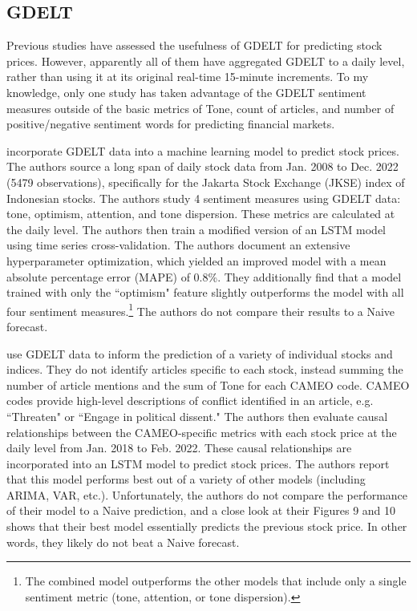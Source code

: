\documentclass[12pt]{article}
\begin{document}
\subsection{GDELT}
Previous studies have assessed the usefulness of GDELT for predicting stock prices. However, apparently all of them have aggregated GDELT to a daily level, rather than using it at its original real-time 15-minute increments. To my knowledge, only one study has taken advantage of the GDELT sentiment measures outside of the basic metrics of Tone, count of articles, and number of positive/negative sentiment words for predicting financial markets.

\textcite{nashir2023indonesian} incorporate GDELT data into a machine learning model to predict stock prices. The authors source a long span of daily stock data from Jan. 2008 to Dec. 2022 (5479 observations), specifically for the Jakarta Stock Exchange (JKSE) index of Indonesian stocks. The authors study 4 sentiment measures using GDELT data: tone, optimism, attention, and tone dispersion. These metrics are calculated at the daily level. The authors then train a modified version of an LSTM model using time series cross-validation. The authors document an extensive hyperparameter optimization, which yielded an improved model with a mean absolute percentage error (MAPE) of 0.8\%. They additionally find that a model trained with only the ``optimism" feature slightly outperforms the model with all four sentiment measures.\footnote{The combined model outperforms the other models that include only a single sentiment metric (tone, attention, or tone dispersion).} The authors do not compare their results to a Naive forecast.

\textcite{wang2024ensemble} use GDELT data to inform the prediction of a variety of individual stocks and indices. They do not identify articles specific to each stock, instead summing the number of article mentions and the sum of Tone for each CAMEO code. CAMEO codes provide high-level descriptions of conflict identified in an article, e.g. ``Threaten" or ``Engage in political dissent." The authors then evaluate causal relationships between the CAMEO-specific metrics with each stock price at the daily level from Jan. 2018 to Feb. 2022. These causal relationships are incorporated into an LSTM model to predict stock prices. The authors report that this model performs best out of a variety of other models (including ARIMA, VAR, etc.). Unfortunately, the authors do not compare the performance of their model to a Naive prediction, and a close look at their Figures 9 and 10 shows that their best model essentially predicts the previous stock price. In other words, they likely do not beat a Naive forecast.
\end{document}
